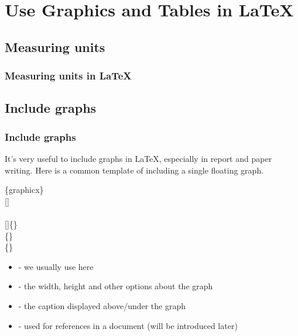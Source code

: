 \section{Use Graphics and Tables in \LaTeX}
\begin{frame}
\end{frame}

\subsection{Measuring units}

\begin{frame}
	\frametitle{Measuring units in \LaTeX}
\end{frame}

\subsection{Include graphs}

\begin{frame}
	\frametitle{Include graphs}
	It's very useful to include graphs in \LaTeX, especially in report and paper writing. Here is a common template of including a single floating graph.
	\begin{command}
		\{graphicx\}\\
		[]\\
		\qquad{}\\
		\qquad{}[]\{\}\\
		\qquad{}\{\}\\
		\qquad{}\{\}\\
		\begin{itemize}
			\item {} - we usually use  here
			\item {} - the width, height and other options about the graph
			\item {} - the caption displayed above/under the graph
			\item {} - used for references in a document (will be introduced later)
		\end{itemize}
	\end{command}
\end{frame}

